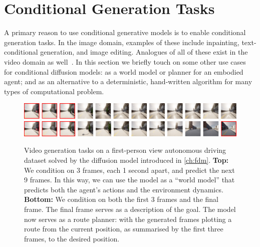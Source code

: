 

\section{Conditional Generation Tasks} \label{sec:conditional-diffusion-tasks}

A primary reason to use conditional generative models is to enable conditional generation tasks. In the image domain, examples of these include inpainting, text-conditional generation, and image editing. Analogues of all of these exist in the video domain as well~\cite{ho2022imagen}. In this section we briefly touch on some other use cases for conditional diffusion models: as a world model or planner for an embodied agent; and as an alternative to a deterministic, hand-written algorithm for many types of computational problem.

\begin{figure}
    \includegraphics[width=\textwidth]{figs/thesis/fdm-example-tasks/world-modeling-thesis.pdf}
    \includegraphics[width=\textwidth]{figs/thesis/fdm-example-tasks/visual-planning-thesis.pdf}
    \caption{Video generation tasks on a first-person view autonomous driving dataset solved by 
    the diffusion model introduced in \cref{ch:fdm}. \textbf{Top:} We condition on 3 frames, each 1 second apart, and predict the next 9 frames. In this way, we can use the model as a ``world model'' that predicts both the agent's actions and the environment dynamics. \textbf{Bottom:} We condition on both the first 3 frames and the final frame. The final frame serves as a description of the goal. The model now serves as a route planner: with the generated frames plotting a route from the current position, as summarised by the first three frames, to the desired position.}
    \label{fig:fdm-example-tasks}
\end{figure}

